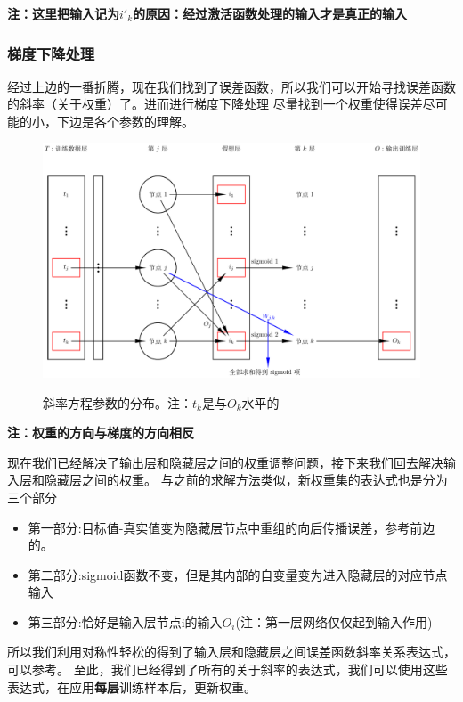 \documentclass[12pt]{article}
\begin{document}
    \textbf{注：这里把输入记为$i'_k$的原因：经过激活函数处理的输入才是真正的输入}

    \subsubsection{梯度下降处理}
    经过上边的一番折腾，现在我们找到了误差函数，所以我们可以开始寻找误差函数的斜率（关于权重）了。进而进行梯度下降处理
    尽量找到一个权重使得误差尽可能的小，下边是各个参数的理解。
    \begin{figure}[!htb]
        \centering
        \includegraphics[scale=0.5]{picture/coef_init.pdf}
        \label{实际参数的分布}
        \caption{斜率方程参数的分布。注：$t_k$是与$O_k$水平的}
    \end{figure}

    \textbf{注：权重的方向与梯度的方向相反}


    现在我们已经解决了输出层和隐藏层之间的权重调整问题，接下来我们回去解决输入层和隐藏层之间的权重。
    与之前的求解方法类似，新权重集的表达式也是分为三个部分
    \begin{itemize}
        \item 第一部分:目标值-真实值变为隐藏层节点中重组的向后传播误差，参考前边的。
        \item 第二部分:sigmoid函数不变，但是其内部的自变量变为进入隐藏层的对应节点输入
        \item 第三部分:恰好是输入层节点i的输入$O_i$(注：第一层网络仅仅起到输入作用)
    \end{itemize}
    所以我们利用对称性轻松的得到了输入层和隐藏层之间误差函数斜率关系表达式，可以参考。
    至此，我们已经得到了所有的关于斜率的表达式，我们可以使用这些表达式，在应用\textbf{每层}训练样本后，更新权重。
    
\end{document}
